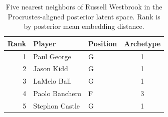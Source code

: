 \begin{table}[htbp]
  \centering\small
  \begin{tabular}{rllc}
    \toprule
    Rank & Player & Position & Archetype \\
    \midrule
    1 & Paul George & G & 1 \\
    2 & Jason Kidd & G & 1 \\
    3 & LaMelo Ball & G & 1 \\
    4 & Paolo Banchero & F & 3 \\
    5 & Stephon Castle & G & 1 \\
    \bottomrule
  \end{tabular}
  \caption{Five nearest neighbors of Russell Westbrook in the Procrustes-aligned posterior latent space. Rank is by posterior mean embedding distance.}
  \label{tab:Russell_Westbrook_neighbors}
\end{table}

